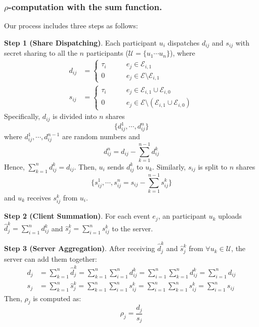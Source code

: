 \subsubsection{$\rho$-computation with the sum function.} Our process includes three steps as follows:


\textbf{Step 1 (Share Dispatching)}. Each participant $u_i$ dispatches $d_{ij}$ and $s_{ij}$ with secret sharing to all the $n$ participants ($\mathcal U = \{u_1\cdots u_n\}$), where
\begin{align}
	d_{ij} & =
	\begin{cases}
		\tau_i & \quad\quad e_j \in \mathcal E_{i,1} \\
		0 & \quad\quad e_j \in \mathcal E\setminus \mathcal E_{i,1}
	\end{cases}\\
	s_{ij} &=
	\begin{cases}
		\tau_i & \quad\quad e_j \in \mathcal E_{i,1}\cup \mathcal E_{i,0} \\
		0 & \quad\quad e_j \in \mathcal E\setminus(\mathcal E_{i,1}\cup \mathcal E_{i,0})
	\end{cases}
\end{align}
Specifically, $d_{ij}$ is divided into $n$ shares
$$\{d_{ij}^1,\cdots,d_{ij}^n\}$$
where $d_{ij}^1, \cdots, d_{ij}^{n-1}$ are random numbers and
$$d_{ij}^n = d_{ij} - \sum_{k=1}^{n-1} d_{ij}^k$$
Hence,
$\sum_{k=1}^n d_{ij}^k = d_{ij}$.
Then, $u_i$ sends $d_{ij}^k$ to $u_k$. Similarly, $s_{ij}$ is split to $n$ shares
$$\{s_{ij}^1,\cdots,s_{ij}^n=s_{ij}-\sum_{k=1}^{n-1} s_{ij}^k\}$$
and $u_k$ receives $s_{ij}^k$ from $u_i$.

\textbf{Step 2 (Client Summation)}. For each event $e_j$, an participant $u_k$ uploads $\hat d_{j}^k=\sum_{i=1}^n d_{ij}^k$ and $\hat s_{j}^k = \sum_{i=1}^n s_{ij}^k$ to the server.

\textbf{Step 3 (Server Aggregation)}. After receiving $\hat d_{j}^k$ and $\hat s_{j}^k$ from $\forall u_k \in \mathcal U$, the server can add them together:
\begin{align}
	d_j & = \sum_{k=1}^n \hat d_{j}^k = \sum_{k=1}^n\sum_{i=1}^n d_{ij}^k = \sum_{i=1}^n \sum_{k=1}^n d_{ij}^k = \sum_{i=1}^n d_{ij} \\
	s_j & = \sum_{k=1}^n \hat s_{j}^k = \sum_{k=1}^n\sum_{i=1}^n s_{ij}^k = \sum_{i=1}^n \sum_{k=1}^n s_{ij}^k = \sum_{i=1}^n s_{ij}
\end{align}
Then, $\rho_j$ is computed as:
\begin{equation}
	\rho_j = \frac{d_j}{s_j}
\end{equation}



